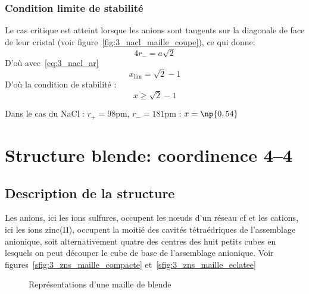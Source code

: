 \subsubsection{Condition limite de stabilité}
Le cas critique est atteint lorsque les anions sont tangents sur la diagonale de face
de leur cristal (voir figure~\ref{fig:3_nacl_maille_coupe}), ce qui donne:
\begin{equation}
    4r_- = a\sqrt{2}
    \label{eq:3_limite_ar-}
\end{equation}
D'où avec~\ref{eq:3_nacl_ar}
\begin{equation}
    x_\text{lim} = \sqrt{2} - 1
\end{equation}
D'où la condition de stabilité :
\begin{equation}
    \boxed{x \geq \sqrt{2} - 1}
    \label{eq:3_stab_x}
\end{equation}

Dans le cas du NaCl : $r_+ = 98$pm, $r_- = 181$pm : $x = \np{0,54}$


\section{Structure blende: coordinence 4\---4}
\subsection{Description de la structure}
Les anions, ici les ions sulfures, occupent les n\oe uds d'un réseau cf et les cations,
ici les ions zinc(II), occupent la moitié des cavités tétraédriques de l’assemblage
anionique, soit alternativement quatre des centres des huit petits cubes en lesquels on peut
découper le cube de base de l’assemblage anionique. Voir figures~\ref{sfig:3_zns_maille_compacte}
et~\ref{sfig:3_zns_maille_eclatee}
\begin{figure}
    \centering
    \qquad
    \qquad
    \caption{Représentations d'une maille de blende}\label{fig:3_zns}
\end{figure}


